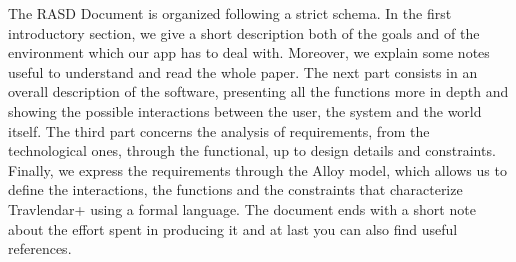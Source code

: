 The RASD Document is organized following a strict schema.
 In the first introductory section, we give a short description both of the goals and of the environment which our app has to deal with. Moreover, we explain some notes useful to understand and read the whole paper. 
The next part consists in an overall description of the software, presenting all the functions more in depth and showing the possible interactions between the user, the system and the world itself. 
The third part concerns the analysis of requirements, from the technological ones, through the functional, up to design details and constraints. 
Finally, we express the requirements through the Alloy model, which allows us to define the interactions, the functions and the constraints that characterize Travlendar+ using a formal language.
The document ends with a short note about the effort spent in producing it and at last you can also find useful references. 
